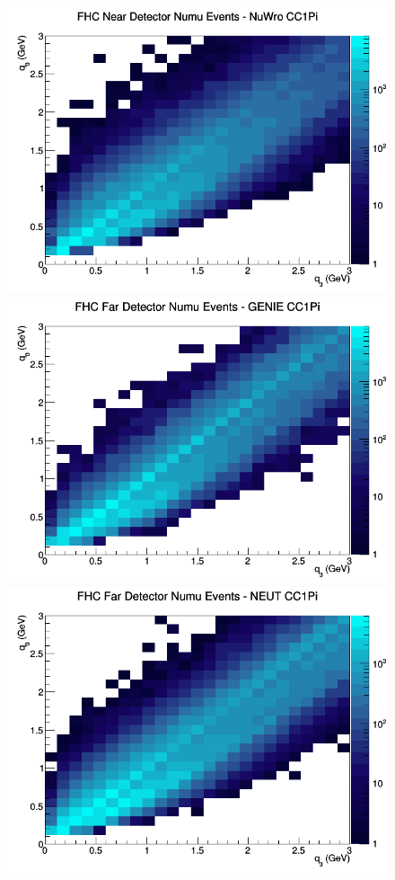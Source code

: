 \documentclass[12pt]{article}
\begin{document}
\begin{figure}[h]
\includegraphics[width=\linewidth]{eff_q0_q3/FGT/CC1Pi_FHC_ND_numu_q3_q0_NuWro.png}
\endminipage
\newline
{}
\includegraphics[width=\linewidth]{eff_q0_q3/FGT/CC1Pi_FHC_FD_numu_q3_q0_GENIE.png}
\endminipage
{}
\includegraphics[width=\linewidth]{eff_q0_q3/FGT/CC1Pi_FHC_FD_numu_q3_q0_NEUT.png}

\end{figure}
\end{document}

